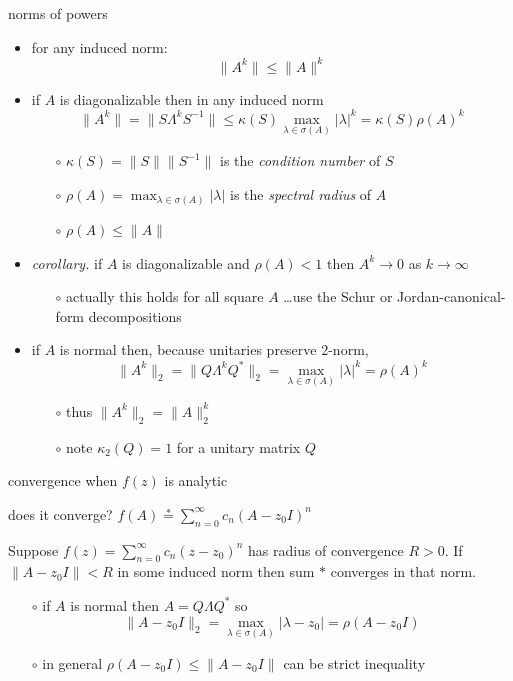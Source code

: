 \documentclass[10pt,hyperref]{beamer}
\newcommand{\ds}{\displaystyle}
\begin{document}
\begin{frame}{norms of powers}

\begin{itemize}
\item for any induced norm:
    $$\|A^k\| \le \|A\|^k$$
\item if $A$ is diagonalizable then in any induced norm
    $$\|A^k\| = \|S\Lambda^k S^{-1}\| \le \kappa(S) \max_{\lambda\in\sigma(A)} |\lambda|^k = \kappa(S) \rho(A)^k$$

\vspace{-3mm}
    \begin{itemize}
    \item[$\circ$] $\kappa(S)=\|S\|\|S^{-1}\|$ is the \emph{condition number} of $S$
    \item[$\circ$] $\rho(A)=\max_{\lambda\in\sigma(A)} |\lambda|$ is the \emph{spectral radius} of $A$
    \item[$\circ$] $\rho(A)\le \|A\|$
    \end{itemize}
\item \emph{corollary.} if $A$ is diagonalizable and $\rho(A)<1$ then $A^k \to 0$ as $k\to\infty$
    \begin{itemize}
    \item[$\circ$] actually this holds for all square $A$ \dots use the Schur or Jordan-canonical-form decompositions
    \end{itemize}
\item if $A$ is normal then, because unitaries preserve $2$-norm,
    $$\|A^k\|_2 = \|Q\Lambda^k Q^*\|_2 = \max_{\lambda\in\sigma(A)} |\lambda|^k = \rho(A)^k$$

\vspace{-3mm}
    \begin{itemize}
    \item[$\circ$] thus $\|A^k\|_2 = \|A\|_2^k$
    \item[$\circ$] note $\kappa_2(Q)=1$ for a unitary matrix $Q$
    \end{itemize}
\end{itemize}
\end{frame}


\begin{frame}{convergence when $f(z)$ is analytic}

does it converge? \hspace{10mm} $\ds f(A) \stackrel{\ast}{=} \sum_{n=0}^\infty c_n (A-z_0 I)^n$

\begin{lemma}
Suppose $f(z) = \sum_{n=0}^\infty c_n (z-z_0)^n$ has radius of convergence $R>0$. If $\|A-z_0 I\|<R$ in some induced norm then sum $\ast$ converges in that norm.
\end{lemma}

    \begin{itemize}
    \item[$\circ$] if $A$ is normal then $A = Q \Lambda Q^*$ so
    $$\|A - z_0 I\|_2 = \max_{\lambda\in\sigma(A)} |\lambda-z_0| = \rho(A-z_0 I)$$
    \item[$\circ$] in general $\rho(A-z_0 I) \le \|A-z_0 I\|$ can be strict inequality
    \end{itemize}
\end{frame}
\end{document}
